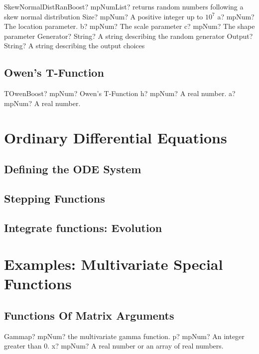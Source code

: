 \documentclass[12pt,a4paper,openany]{book}
\begin{document}
\begin{mpFunctionsExtract}
\mpFunctionSix
{SkewNormalDistRanBoost? mpNumList? returns random numbers following a skew normal distribution}
{Size? mpNum? A positive integer up to $10^7$}
{a? mpNum? The location parameter.}
{b? mpNum? The scale parameter}
{c? mpNum? The shape parameter}
{Generator? String? A string describing the random generator}
{Output? String? A string describing the output choices}
\end{mpFunctionsExtract}

\section{Owen's T-Function}

\begin{mpFunctionsExtract}
\mpFunctionTwo
{TOwenBoost? mpNum? Owen's T-Function}
{h? mpNum? A real number.}
{a? mpNum? A real number.}
\end{mpFunctionsExtract}

\chapter{Ordinary Differential Equations}

\section{Defining the ODE System}

\section{Stepping Functions}

\section{Integrate functions: Evolution}

\chapter{Examples: Multivariate Special Functions}

\section{Functions Of Matrix Arguments}

\begin{mpFunctionsExtract}
\mpFunctionTwoNotImplemented
{Gammap? mpNum? the multivariate gamma function.}
{p? mpNum? An integer greater than 0.}
{x? mpNum? A real number or an array of real numbers.}
\end{mpFunctionsExtract}
\end{document}
